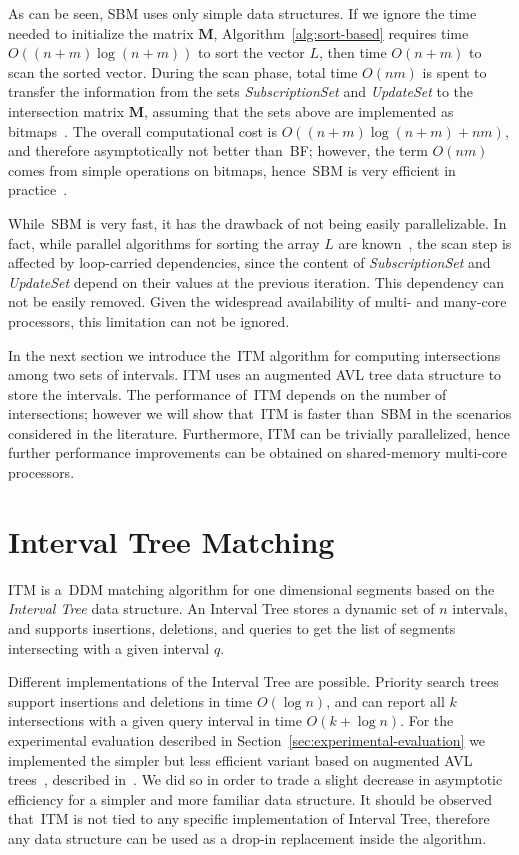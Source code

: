 \documentclass[10pt, conference, compsocconf]{IEEEtran}
\begin{document}
As can be seen, \ac{SBM} uses only simple data structures. If we
ignore the time needed to initialize the matrix $\mathbf{M}$,
Algorithm~\ref{alg:sort-based} requires time $O\left( (n+m) \log (n+m)
\right)$ to sort the vector $L$, then time $O(n+m)$ to scan the sorted
vector. During the scan phase, total time $O(nm)$ is spent to transfer
the information from the sets \textit{SubscriptionSet} and
\textit{UpdateSet} to the intersection matrix $\mathbf{M}$, assuming
that the sets above are implemented as bitmaps~\cite{Raczy2005}. The
overall computational cost is $O\left( (n+m) \log (n+m) + nm \right)$,
and therefore asymptotically not better than~\ac{BF}; however, the
term $O(nm)$ comes from simple operations on bitmaps, hence~\ac{SBM}
is very efficient in practice~\cite{Raczy2005}.

While~\ac{SBM} is very fast, it has the drawback of not being easily
parallelizable. In fact, while parallel algorithms for sorting the
array $L$ are known~\cite{parallel-merge-sort}, the scan step is
affected by loop-carried dependencies, since the content of
\textit{SubscriptionSet} and \textit{UpdateSet} depend on their
values at the previous iteration. This dependency can not be easily
removed. Given the widespread availability of multi- and many-core
processors, this limitation can not be ignored.

In the next section we introduce the~\acl{ITM} algorithm for computing
intersections among two sets of intervals. \ac{ITM} uses an augmented
AVL tree data structure to store the intervals.  The performance
of~\ac{ITM} depends on the number of intersections; however we will
show that~\ac{ITM} is faster than~\ac{SBM} in the scenarios considered
in the literature.  Furthermore, \ac{ITM} can be trivially
parallelized, hence further performance improvements can be obtained
on shared-memory multi-core processors.


\section{Interval Tree Matching}\label{sec:parallel-ddm}

\ac{ITM} is a~\ac{DDM} matching algorithm for one dimensional segments
based on the \emph{Interval Tree} data structure. An Interval Tree
stores a dynamic set of $n$ intervals, and supports insertions,
deletions, and queries to get the list of segments intersecting with a
given interval $q$. 

Different implementations of the Interval Tree are possible. Priority
search trees~\cite{McCreight85} support insertions and deletions in
time $O(\log n)$, and can report all $k$ intersections with a given
query interval in time $O(k + \log n)$.  For the experimental
evaluation described in Section~\ref{sec:experimental-evaluation} we
implemented the simpler but less efficient variant based on augmented
AVL trees~\cite{avl}, described in~\cite[Chapter 14.3]{Cormen2009}. We
did so in order to trade a slight decrease in asymptotic efficiency
for a simpler and more familiar data structure. It should be observed
that~\ac{ITM} is not tied to any specific implementation of Interval
Tree, therefore any data structure can be used as a drop-in
replacement inside the algorithm.
\end{document}
